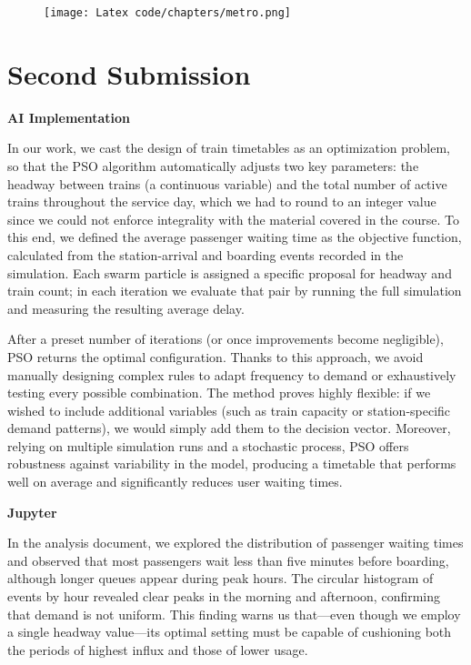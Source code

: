 \documentclass[a4paper,11pt,oneside]{book}
\begin{document}
    \begin{figure}
        \centering
        \vspace{-10 cm} 
        \texttt{[image: Latex code/chapters/metro.png]}
    \end{figure}

    \newpage
\thispagestyle{empty}
\chapter*{\centering \Large Second Submission}

{\centering\large \textbf{AI Implementation}}
 \vspace{0.5 cm} 

In our work, we cast the design of train timetables as an optimization problem, so that the PSO algorithm automatically adjusts two key parameters: the headway between trains (a continuous variable) and the total number of active trains throughout the service day, which we had to round to an integer value since we could not enforce integrality with the material covered in the course. To this end, we defined the average passenger waiting time as the objective function, calculated from the station-arrival and boarding events recorded in the simulation. Each swarm particle is assigned a specific proposal for headway and train count; in each iteration we evaluate that pair by running the full simulation and measuring the resulting average delay.

After a preset number of iterations (or once improvements become negligible), PSO returns the optimal configuration. Thanks to this approach, we avoid manually designing complex rules to adapt frequency to demand or exhaustively testing every possible combination. The method proves highly flexible: if we wished to include additional variables (such as train capacity or station-specific demand patterns), we would simply add them to the decision vector. Moreover, relying on multiple simulation runs and a stochastic process, PSO offers robustness against variability in the model, producing a timetable that performs well on average and significantly reduces user waiting times.

\vspace{1 cm} 
{\centering\large \textbf{Jupyter}}
 \vspace{0.5 cm} 
 
In the analysis document, we explored the distribution of passenger waiting times and observed that most passengers wait less than five minutes before boarding, although longer queues appear during peak hours. The circular histogram of events by hour revealed clear peaks in the morning and afternoon, confirming that demand is not uniform. This finding warns us that—even though we employ a single headway value—its optimal setting must be capable of cushioning both the periods of highest influx and those of lower usage.
\end{document}
